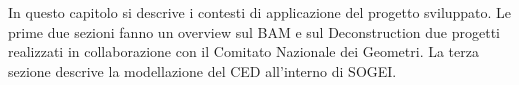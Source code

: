 In questo capitolo si descrive i contesti di applicazione del progetto sviluppato.
Le prime due sezioni fanno un overview sul BAM e sul Deconstruction due progetti
realizzati in collaborazione con il Comitato Nazionale dei Geometri.
La terza sezione descrive la modellazione del CED all'interno di SOGEI.
